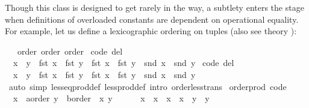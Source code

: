 \begin{isabellebody}
\begin{isamarkuptext}
  Though this  class is designed to get rarely in
  the way, a subtlety
  enters the stage when definitions of overloaded constants
  are dependent on operational equality.  For example, let
  us define a lexicographic ordering on tuples
  (also see theory \hyperlink{theory.Product-ord}{\mbox{}}):%
\end{isamarkuptext}%
\isamarkuptrue%
%
\isadelimquote
%
\endisadelimquote
%
\isatagquote
{}\isamarkupfalse%
\ {\isachardoublequoteopen}{\isacharasterisk}{\isachardoublequoteclose}\ {\isacharcolon}{\isacharcolon}\ {\isacharparenleft}order{\isacharcomma}\ order{\isacharparenright}\ order\isanewline
{}\isanewline
\isanewline
{}\isamarkupfalse%
\ {\isacharbrackleft}code\ del{\isacharbrackright}{\isacharcolon}\isanewline
\ \ {\isachardoublequoteopen}x\ {\isasymle}\ y\ {\isasymlongleftrightarrow}\ fst\ x\ {\isacharless}\ fst\ y\ {\isasymor}\ fst\ x\ {\isacharequal}\ fst\ y\ {\isasymand}\ snd\ x\ {\isasymle}\ snd\ y{\isachardoublequoteclose}\isanewline
\isanewline
{}\isamarkupfalse%
\ {\isacharbrackleft}code\ del{\isacharbrackright}{\isacharcolon}\isanewline
\ \ {\isachardoublequoteopen}x\ {\isacharless}\ y\ {\isasymlongleftrightarrow}\ fst\ x\ {\isacharless}\ fst\ y\ {\isasymor}\ fst\ x\ {\isacharequal}\ fst\ y\ {\isasymand}\ snd\ x\ {\isacharless}\ snd\ y{\isachardoublequoteclose}\isanewline
\isanewline
{}\isamarkupfalse%
\ \isamarkupfalse%
\isanewline
{}\isamarkupfalse%
\ {\isacharparenleft}auto\ simp{\isacharcolon}\ less{\isacharunderscore}eq{\isacharunderscore}prod{\isacharunderscore}def\ less{\isacharunderscore}prod{\isacharunderscore}def\ intro{\isacharcolon}\ order{\isacharunderscore}less{\isacharunderscore}trans{\isacharparenright}\isanewline
\isanewline
{}\isamarkupfalse%
\isanewline
\isanewline
{}\isamarkupfalse%
\ order{\isacharunderscore}prod\ {\isacharbrackleft}code{\isacharbrackright}{\isacharcolon}\isanewline
\ \ {\isachardoublequoteopen}{\isacharparenleft}x{}\ {\isasymColon}\ {\isacharprime}a{\isasymColon}order{\isacharcomma}\ y{}\ {\isasymColon}\ {\isacharprime}b{\isasymColon}order{\isacharparenright}\ {\isacharless}\ {\isacharparenleft}x{}{\isacharcomma}\ y{}{\isacharparenright}\ {\isasymlongleftrightarrow}\isanewline
\ \ \ \ \ x{}\ {\isacharless}\ x{}\ {\isasymor}\ x{}\ {\isacharequal}\ x{}\ {\isasymand}\ y{}\ {\isacharless}\ y{}{\isachardoublequoteclose}\isanewline

\end{isabellebody}
